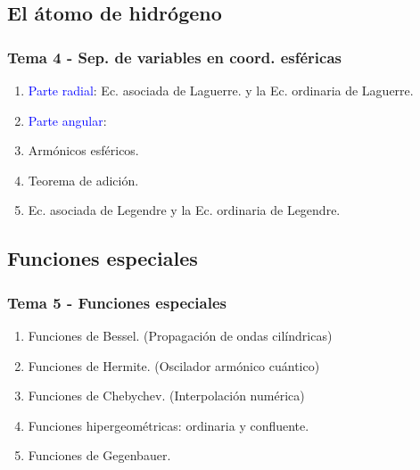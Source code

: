 \documentclass[12pt]{beamer}
\begin{document}
\subsection{El átomo de hidrógeno}

\begin{frame}
\frametitle{Tema 4 - Sep. de variables en coord. esféricas}
\begin{enumerate}[<+->]
\item \textcolor{blue}{Parte radial}: Ec. asociada de Laguerre. y la Ec. ordinaria de Laguerre.
\item \textcolor{blue}{Parte angular}:
\item Armónicos esféricos.
\item Teorema de adición.
\item Ec. asociada de Legendre y la Ec. ordinaria de Legendre.
\end{enumerate}
\end{frame}

\subsection{Funciones especiales}

\begin{frame}
\frametitle{Tema 5 - Funciones especiales}
\begin{enumerate}[<+->]
\item Funciones de Bessel. (Propagación de ondas cilíndricas)
\item Funciones de Hermite. (Oscilador armónico cuántico)
\item Funciones de Chebychev. (Interpolación numérica)
\item Funciones hipergeométricas: ordinaria y confluente.
\item Funciones de Gegenbauer.
\end{enumerate}
\end{frame}
\end{document}
